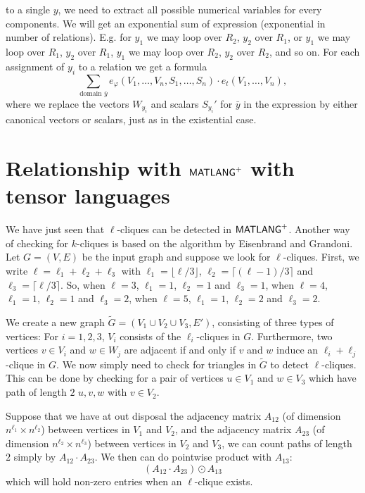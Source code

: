 \begin{itemize}
to a single $y$, we need to extract all possible numerical variables for every components. We will get an exponential sum of expression (exponential in number
of relations). E.g. for $y_1$ we may loop over $R_2$, $y_2$ over $R_1$, or  $y_1$ we may loop over $R_1$, $y_2$ over $R_1$,  $y_1$ we may loop over $R_2$, $y_2$ over $R_2$,
and so on.  For each assignment of $y_i$ to a relation we get a formula
$$
\sum_{\text{domain $\bar y$}} e_\varphi(V_1,\ldots,V_n,S_1,\ldots,S_n)\cdot e_t(V_1,\ldots,V_n),
$$
where we replace the vectors $W_{y_i}$ and scalars $S_{y_i}'$ for $\bar y$ in the expression by either canonical vectors or scalars, just as in the existential case.
\end{itemize}

\section{Relationship with $\mathsf{MATLANG}^{\sf +}$ with tensor languages}
We have just seen that $\ell$-cliques can be detected in $\mathsf{MATLANG}^{\sf +}$. Another way of checking for $k$-cliques is based on the algorithm by Eisenbrand and Grandoni.
Let $G=(V,E)$ be the input graph and suppose we look for $\ell$-cliques. First, we write $\ell=\ell_1+\ell_2+\ell_3$ with $\ell_1=\lfloor\ell/3\rfloor$, $\ell_2=\lceil (\ell-1)/3\rceil$ and
$\ell_3=\lceil \ell/3\rceil$. So, when $\ell=3$, $\ell_1=1$, $\ell_2=1$ and $\ell_3=1$,
when $\ell=4$, $\ell_1=1$, $\ell_2=1$ and $\ell_3=2$, when $\ell=5$, $\ell_1=1$, $\ell_2=2$ and $\ell_3=2$.

We create a new graph $\tilde{G}=(V_1\cup V_2\cup V_3,E')$, consisting of three types of vertices: For $i=1,2,3$, $V_i$ consists of the $\ell_i$-cliques in $G$. Furthermore, two vertices $v\in V_i$ and $w\in W_j$
are adjacent if and only if $v$ and $w$ induce an $\ell_i+\ell_j$-clique in $G$. We now simply need to check for triangles in $\tilde{G}$ to detect $\ell$-cliques. This can be done by
checking for a pair of vertices $u\in V_1$ and $w\in V_3$ which have path of length $2$ $u,v,w$ with $v\in V_2$.

Suppose that we have at out disposal the adjacency matrix $A_{12}$ (of dimension $n^{\ell_1}\times n^{\ell_2}$) between vertices in $V_1$ and $V_2$,
and  the adjacency matrix $A_{23}$ (of dimension $n^{\ell_2}\times n^{\ell_3}$) between vertices in $V_2$ and $V_3$, we can count paths of length $2$
simply by $A_{12}\cdot A_{23}$. We then can do pointwise product with $A_{13}$:
$$(A_{12}\cdot A_{23})\odot A_{13}
$$
which will hold non-zero entries when an $\ell$-clique exists.


